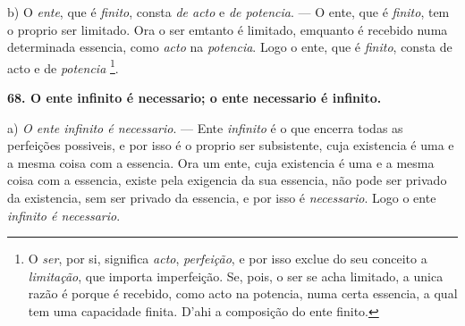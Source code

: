 
b) O \emph{ente}, que é \emph{finito}, consta \emph{de acto} e \emph{de potencia}. --- O ente, que é \emph{finito}, tem o proprio ser limitado. Ora o ser emtanto é limitado, emquanto é recebido numa determinada essencia, como \emph{acto} na \emph{potencia}. Logo o ente, que é \emph{finito}, consta de acto e de \emph{potencia} \footnote{O \emph{ser}, por si, significa \emph{acto}, \emph{perfeição}, e por isso exclue do seu conceito a \emph{limitação}, que importa imperfeição. Se, pois, o ser se acha limitado, a unica razão é porque é recebido, como acto na potencia, numa certa essencia, a qual tem uma capacidade finita. D'ahi a composição do ente finito.}.

\textbf{68. O ente infinito é necessario; o ente necessario é infinito.}

a) \emph{O ente infinito é necessario}. --- Ente \emph{infinito} é o que encerra todas as perfeições possiveis, e por isso é o proprio ser subsistente, cuja existencia é uma e a mesma coisa com a essencia. Ora um ente, cuja existencia é uma e a mesma coisa com a essencia, existe pela exigencia da sua essencia, não pode ser privado da existencia, sem ser privado da essencia, e por isso é \emph{necessario}. Logo o ente \emph{infinito é necessario}.


